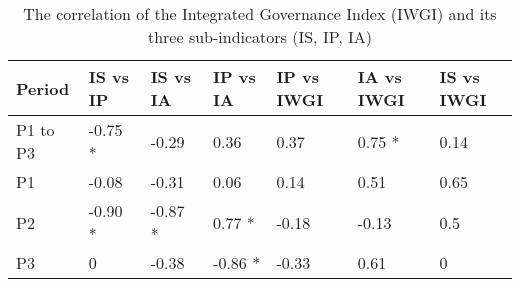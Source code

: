\begin{table}[htbp]
    \centering
    \caption{The correlation of the Integrated Governance Index (IWGI) and its three sub-indicators (IS, IP, IA)}
      \begin{tabularx}{\textwidth}{XXXXXXX}
      \toprule
      Period & \multicolumn{1}{l}{IS vs IP} & \multicolumn{1}{l}{IS vs IA} & IP vs IA & \multicolumn{1}{l}{IP vs IWGI} & \multicolumn{1}{l}{IA vs IWGI} & \multicolumn{1}{l}{IS vs IWGI} \\
      \midrule
      P1 to P3 & \multicolumn{1}{l}{-0.75 *} & -0.29 & 0.36 & 0.37  & \multicolumn{1}{l}{0.75 *} & 0.14 \\
      P1    & -0.08 & -0.31 & 0.06 & 0.14  & 0.51  & 0.65 \\
      P2    & \multicolumn{1}{l}{-0.90 *} & \multicolumn{1}{l}{-0.87 *} & 0.77 * & -0.18 & -0.13 & 0.5 \\
      P3    & 0     & -0.38 & -0.86 * & -0.33 & 0.61  & 0 \\
      \bottomrule
      \end{tabularx}%
    \label{tab:corr}%
\end{table}%
